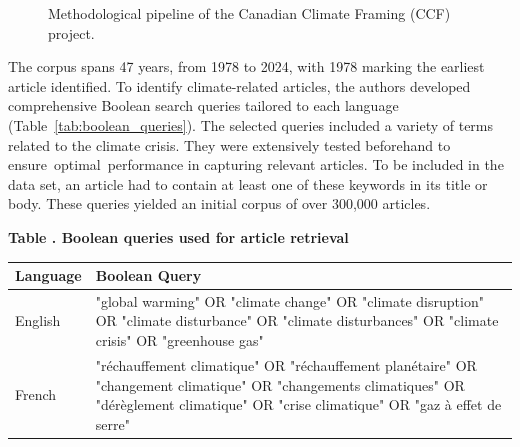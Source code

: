 \documentclass[12pt]{article}
\renewcommand\_{\texttt{\detokenize{_}\allowbreak}}
\begin{document}
\begin{landscape}
\begin{figure}[h!]
{
}
\caption{Methodological pipeline of the Canadian Climate Framing (CCF) project.}
\label{fig:methodology_overview}
\end{figure}
\vspace*{\fill}

\end{landscape}

The corpus spans 47 years, from 1978 to 2024, with 1978 marking the earliest article identified. To identify climate-related articles, the authors developed comprehensive Boolean search queries tailored to each language (Table~\ref{tab:boolean_queries}). The selected queries included a variety of terms related to the climate crisis. They were extensively tested beforehand to ensure optimal performance in capturing relevant articles. To be included in the data set, an article had to contain at least one of these keywords in its title or body. These queries yielded an initial corpus of over 300,000 articles. 

\begin{center}
\begingroup
{}\label{tab:boolean_queries}
\begin{minipage}{0.95\linewidth}
\centering
\setlength{\tabcolsep}{8pt}
\renewcommand{\arraystretch}{1.25}
\textbf{Table \thetable. Boolean queries used for article retrieval}
\vspace{0.5em}

{\fontsize{10}{12}\selectfont
\begin{tabular}{>{\raggedright\arraybackslash}p{2.8cm} >{\raggedright\arraybackslash}p{12cm}}
\toprule
\textbf{Language} & \textbf{Boolean Query} \\
\midrule
English & "global warming" OR "climate change" OR "climate disruption" OR "climate disturbance" OR "climate disturbances" OR "climate crisis" OR "greenhouse gas" \\
French & "réchauffement climatique" OR "réchauffement planétaire" OR "changement climatique" OR "changements climatiques" OR "dérèglement climatique" OR "crise climatique" OR "gaz à effet de serre" \\
\bottomrule
\end{tabular}
}
\end{minipage}
\endgroup
\end{center}
\end{document}
